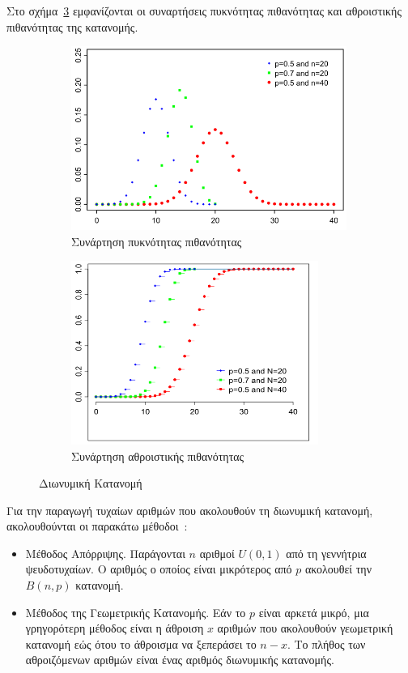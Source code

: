 \documentclass[12pt]{report}
\begin{document}
Στο σχήμα~\ref{fig:Binom_Dist} εμφανίζονται οι συναρτήσεις πυκνότητας πιθανότητας και αθροιστικής πιθανότητας της κατανομής.
\begin{figure}[h]
\begin{subfigure}{0.5\textwidth}
\includegraphics[width=1.0\linewidth, height=6cm]{bin_dist_pmf} 
\caption{Συνάρτηση πυκνότητας πιθανότητας}
\label{fig:Binom_Dist_PMF}
\end{subfigure}
\begin{subfigure}{0.5\textwidth}
\includegraphics[width=1.0\linewidth, height=6cm]{bin_dist_cdf}
\caption{Συνάρτηση αθροιστικής πιθανότητας}
\label{fig:Binom_Dist_CDF}
\end{subfigure}
 
\caption{Διωνυμική Κατανομή}
\label{fig:Binom_Dist}
\end{figure}

Για την παραγωγή τυχαίων αριθμών που ακολουθούν τη διωνυμική κατανομή, ακολουθούνται οι παρακάτω μέθοδοι~\cite{book:07}:
\begin{itemize}
  \item Μέθοδος Απόρριψης. Παράγονται \(n\) αριθμοί \(U(0, 1)\) από τη γεννήτρια ψευδοτυχαίων. Ο αριθμός ο οποίος είναι μικρότερος από \(p\) ακολουθεί την \(B(n, p)\) κατανομή.
  \item Μέθοδος της Γεωμετρικής Κατανομής. Εάν το \(p\) είναι αρκετά μικρό, μια γρηγορότερη μέθοδος είναι η άθροιση \(x\) αριθμών που ακολουθούν γεωμετρική κατανομή εώς ότου το άθροισμα να ξεπεράσει το \(n-x\). Το πλήθος των αθροιζόμενων αριθμών είναι ένας αριθμός διωνυμικής κατανομής.
\end{itemize}
\end{document}
